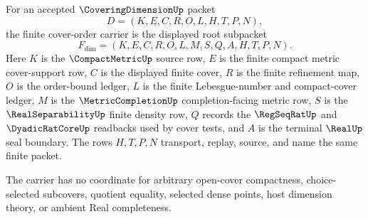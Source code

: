 \begin{definition}
\label{def:covering-dimension-finite-cover-order-carrier}
For an accepted $\CoveringDimensionUp$ packet
$$
D=(K,E,C,R,O,L,H,T,P,N),
$$
the finite cover-order carrier is the displayed root subpacket
$$
F_{\dim}=(K,E,C,R,O,L,M,S,Q,A,H,T,P,N).
$$
Here $K$ is the $\CompactMetricUp$ source row, $E$ is the finite compact metric cover-support row, $C$ is the displayed finite cover, $R$ is the finite refinement map, $O$ is the order-bound ledger, $L$ is the finite Lebesgue-number and compact-cover ledger, $M$ is the $\MetricCompletionUp$ completion-facing metric row, $S$ is the $\RealSeparabilityUp$ finite density row, $Q$ records the $\RegSeqRatUp$ and $\DyadicRatCoreUp$ readbacks used by cover tests, and $A$ is the terminal $\RealUp$ seal boundary. The rows $H,T,P,N$ transport, replay, source, and name the same finite packet.

The carrier has no coordinate for arbitrary open-cover compactness, choice-selected subcovers, quotient equality, selected dense points, host dimension theory, or ambient Real completeness.
\end{definition}

